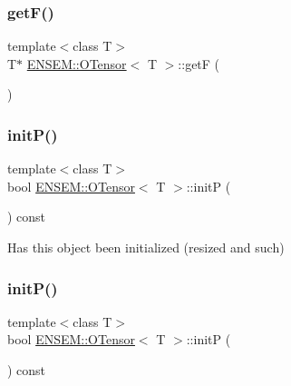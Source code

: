 \subsubsection{\texorpdfstring{getF()}{getF()}\hspace{0.1cm}{\footnotesize\ttfamily [4/4]}}
{\footnotesize\ttfamily template$<$class T$>$ \\
T$\ast$ \mbox{\hyperlink{classENSEM_1_1OTensor}{E\+N\+S\+E\+M\+::\+O\+Tensor}}$<$ T $>$\+::getF (\begin{DoxyParamCaption}{ }\end{DoxyParamCaption})\hspace{0.3cm}{\ttfamily [inline]}}

\mbox{\label{classENSEM_1_1OTensor_a3f591732bdd0b358cde1069b21fbf1f5}} 
\subsubsection{\texorpdfstring{initP()}{initP()}\hspace{0.1cm}{\footnotesize\ttfamily [1/2]}}
{\footnotesize\ttfamily template$<$class T$>$ \\
bool \mbox{\hyperlink{classENSEM_1_1OTensor}{E\+N\+S\+E\+M\+::\+O\+Tensor}}$<$ T $>$\+::initP (\begin{DoxyParamCaption}{ }\end{DoxyParamCaption}) const\hspace{0.3cm}{\ttfamily [inline]}}



Has this object been initialized (resized and such) 

\mbox{\label{classENSEM_1_1OTensor_a3f591732bdd0b358cde1069b21fbf1f5}} 
\subsubsection{\texorpdfstring{initP()}{initP()}\hspace{0.1cm}{\footnotesize\ttfamily [2/2]}}
{\footnotesize\ttfamily template$<$class T$>$ \\
bool \mbox{\hyperlink{classENSEM_1_1OTensor}{E\+N\+S\+E\+M\+::\+O\+Tensor}}$<$ T $>$\+::initP (\begin{DoxyParamCaption}{ }\end{DoxyParamCaption}) const\hspace{0.3cm}{\ttfamily [inline]}}




